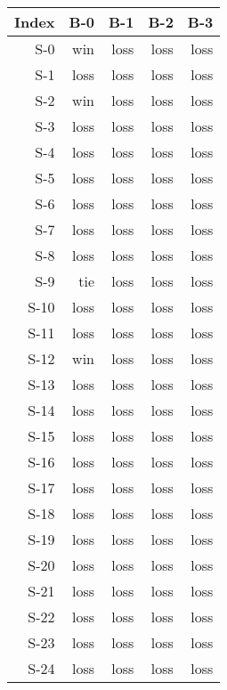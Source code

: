 \begin{tabular}{ | r | r | r | r | r | }
    \hline
        Index  &    B-0  &    B-1  &    B-2  &    B-3  \\
    \hline
    \hline
          S-0  &    win  &   loss  &   loss  &   loss  \\
    \hline
          S-1  &   loss  &   loss  &   loss  &   loss  \\
    \hline
          S-2  &    win  &   loss  &   loss  &   loss  \\
    \hline
          S-3  &   loss  &   loss  &   loss  &   loss  \\
    \hline
          S-4  &   loss  &   loss  &   loss  &   loss  \\
    \hline
          S-5  &   loss  &   loss  &   loss  &   loss  \\
    \hline
          S-6  &   loss  &   loss  &   loss  &   loss  \\
    \hline
          S-7  &   loss  &   loss  &   loss  &   loss  \\
    \hline
          S-8  &   loss  &   loss  &   loss  &   loss  \\
    \hline
          S-9  &    tie  &   loss  &   loss  &   loss  \\
    \hline
         S-10  &   loss  &   loss  &   loss  &   loss  \\
    \hline
         S-11  &   loss  &   loss  &   loss  &   loss  \\
    \hline
         S-12  &    win  &   loss  &   loss  &   loss  \\
    \hline
         S-13  &   loss  &   loss  &   loss  &   loss  \\
    \hline
         S-14  &   loss  &   loss  &   loss  &   loss  \\
    \hline
         S-15  &   loss  &   loss  &   loss  &   loss  \\
    \hline
         S-16  &   loss  &   loss  &   loss  &   loss  \\
    \hline
         S-17  &   loss  &   loss  &   loss  &   loss  \\
    \hline
         S-18  &   loss  &   loss  &   loss  &   loss  \\
    \hline
         S-19  &   loss  &   loss  &   loss  &   loss  \\
    \hline
         S-20  &   loss  &   loss  &   loss  &   loss  \\
    \hline
         S-21  &   loss  &   loss  &   loss  &   loss  \\
    \hline
         S-22  &   loss  &   loss  &   loss  &   loss  \\
    \hline
         S-23  &   loss  &   loss  &   loss  &   loss  \\
    \hline
         S-24  &   loss  &   loss  &   loss  &   loss  \\
    \hline
\end{tabular}


